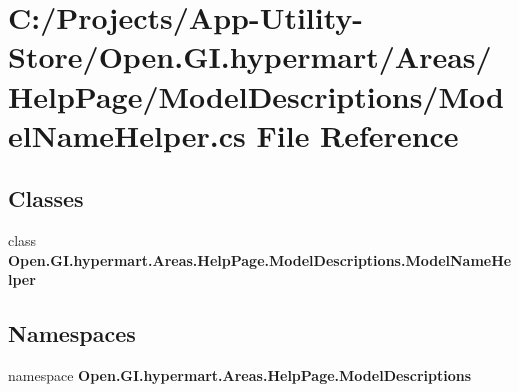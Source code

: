\section{C\+:/\+Projects/\+App-\/\+Utility-\/\+Store/\+Open.G\+I.\+hypermart/\+Areas/\+Help\+Page/\+Model\+Descriptions/\+Model\+Name\+Helper.cs File Reference}
\label{_model_name_helper_8cs}
\subsection*{Classes}
\begin{DoxyCompactItemize}
\item 
class {\bfseries Open.\+G\+I.\+hypermart.\+Areas.\+Help\+Page.\+Model\+Descriptions.\+Model\+Name\+Helper}
\end{DoxyCompactItemize}
\subsection*{Namespaces}
\begin{DoxyCompactItemize}
\item 
namespace \textbf{ Open.\+G\+I.\+hypermart.\+Areas.\+Help\+Page.\+Model\+Descriptions}
\end{DoxyCompactItemize}

